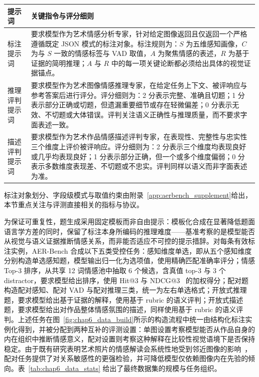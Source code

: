 \begin{table}[!htbp]
    \centering
    \vspace{0.5em}\centering\wuhao
    \setlength{\tabcolsep}{5pt}
    \renewcommand{\arraystretch}{1.15}
    \begin{tabularx}{\textwidth}{@{}>{\raggedright\arraybackslash}p{}>{\raggedright\arraybackslash}X@{}}
    \toprule
    提示词 & 关键指令与评分细则 \\
    \midrule
    标注提示词 & 要求模型作为艺术情感分析专家，针对给定图像返回且仅返回一个严格遵循既定 JSON 模式的标注对象。标注规则为：$S$ 为五维感知画像，$C$ 为与 $S$ 一致的情感标签与 VAD 取值，$A$ 为聚焦情感的表述，$R$ 为基于证据的简明推理；$A$ 与 $R$ 中的每一项关键论断都必须给出具体的视觉证据锚点。 \\
    \midrule
    推理评判提示词 & 要求模型作为艺术图像情感推理专家，在给定任务上下文、被评响应与参考答案后进行评分。评分细则为：2 分表示完整、准确且切题；1 分表示部分正确或切题，但遗漏重要细节或存在轻微偏差；0 分表示无效、不切题或大体错误。评判关注语义正确性与推理质量，而不要求字面表述一致。 \\
    \midrule
    描述评判提示词 & 要求模型作为艺术作品情感描述评判专家，在表现性、完整性与忠实性三个维度上评价被评响应。评分细则为：2 分表示三个维度均表现良好或几乎均表现良好；1 分表示部分正确，但一个或多个维度偏弱；0 分表示多数维度表现差、不切题或不忠实。评判同样以语义而非字面表述为准。 \\
    \bottomrule
    \end{tabularx}
\end{table}

标注对象划分、字段级模式与取值约束由附录~\ref{app:aerbench_supplement}给出，本节重点关注与评测直接相关的指标与协议。

为保证可重复性，题生成采用固定模板而非自由提示：模板化合成在显著降低题面语言学方差的同时，保留了标注本身所编码的推理难度——基准考察的是模型能否从视觉与语义证据推断情感关系，而非能否适应不可控的提示措辞。对每条有效标注实例，AER-Bench 合成以下五类受控任务：感知维度单选，即从五个感知维度分别构造单选感知题，模型输出归一化为选项值，使用精确匹配准确率评分；情感 Top-3 排序，从共享 12 词情感池中抽取 6 个候选，含真值 top-3 与 3 个 distractor，要求模型给出排序，使用 Hit@3 与 NDCG@3~\cite{NDCG} 的加权得分；配对题构造配对感知、配对 VAD 与配对推理三类，统一为左右单选格式；开放式推理题，要求模型给出基于证据的解释，使用基于 rubric 的语义评判；开放式描述题，要求模型给出对作品整体情感氛围的描述，同样使用基于 rubric 的语义评判。上述任务在图~\ref{fig:chap6_data_build}所示的构造流程中统一由结构化标注实例化得到，并被分配到两种互补的评测设置：单图设置考察模型能否从作品自身的内在组织中推断情感意义，配对设置则考察这种解释在比较性视觉语境下是否保持稳定。由于既有研究表明艺术照片的情感解读会系统性地受到邻近图像的影响~\cite{reymond2025pictorial}，配对任务提供了对关系敏感性的更强检验，并可降低模型仅依赖图像内在先验的倾向。表~\ref{tab:chap6_data_stats} 给出了最终数据集的规模与任务组织。

